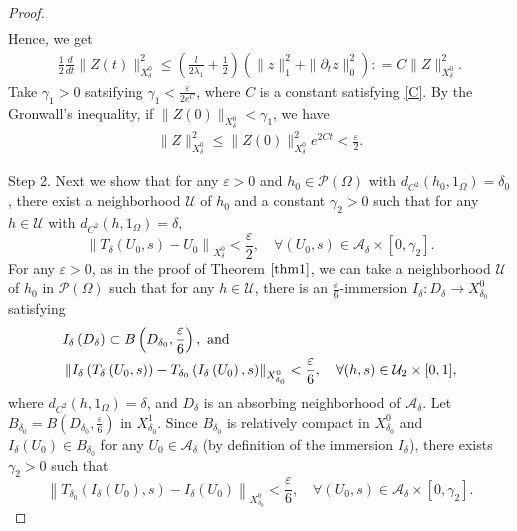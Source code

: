 \documentclass[11pt]{amsart}
\begin{document}
\begin{proof}
\begin{align*}
\end{align*}
Hence,  we get 
\begin{align}    \label{C}
    \frac{1}{2}\frac{d}{dt}\|Z(t)\|^2_{X^0_{\delta}}\leq \left(\frac{l}{2\lambda_1}+\frac{1}{2}\right)(\| z\|^2_1 +\|\partial_t z\|^2_0) 
   : = C\|Z\|^2_{X^0_{\delta}}.
\end{align}
Take $\gamma_1 >0$ satsifying $\gamma_1 < \frac{\varepsilon}{2e^C}$, where $C$ is a constant satisfying  \eqref{C}.
By the Gronwall's inequality, if $\|Z(0)\|_{X^0_{\delta}} < \gamma_1$, we have
\begin{align}\label{Lipschitz}
    \|Z\|^2_{X^0_{\delta}}\leq \|Z(0)\|^2_{X^0_{\delta}} e^{2Ct}<\frac{\varepsilon}{2}.
\end{align}

Step 2.
Next we show that for any $\varepsilon>0$ and $h_{0} \in \mathcal P(\Omega)$ with $d_{C^2}(h_0,1_{\Omega})=\delta_0$, there exist a neighborhood $\mathcal{U}$ of $h_{0}$ and a constant $\gamma_{2}>0$ such that for any $h \in \mathcal{U}$ with $d_{C^2}(h,1_{\Omega})=\delta$,
\begin{equation*}
\left\|T_{\delta}\left(U_{0}, s\right)-U_{0}\right\|_{X^0_{{\delta}}}<\frac{\varepsilon}{2}, \quad \forall\left(U_{0}, s\right) \in \mathcal{A}_{{\delta}} \times\left[0, \gamma_{2}\right] . 
\end{equation*}
For any $\varepsilon>0$, as in the proof of Theorem $\ref{thm1}$, we can take a neighborhood $\mathcal{U}$ of $h_{0}$ in $\mathcal P(\Omega)$ such that for any $h \in \mathcal{U}$, there is an $\frac{\varepsilon}{6}$-immersion $I_{{\delta}}: D_{{\delta}} \rightarrow {X^0_{{\delta}_{0}}}$ satisfying
\begin{align} \label{conti}
&I_\delta\left(D_{{\delta}}\right) \subset B\left(D_{{\delta}_{0}}, \frac{\varepsilon}{6}\right), \text { and } \notag \\
&\left\|I_{{\delta}}\left(T_{{\delta}}\left(U_{0}, s\right)\right)-T_{{\delta}_{0}}\left(I_{{\delta}}\left(U_{0}\right), s\right)\right\|_{X^0_{{\delta}_{0}}}<\frac{\varepsilon}{6}, \quad \forall(h, s) \in \mathcal{U}_2 \times[0,1],
\end{align}
where $d_{C^2}(h,1_{\Omega}) = \delta$, and $D_\delta$ is an absorbing neighborhood of $\mathcal A_\delta$.
Let $B_{{\delta}_0} = B(D_{{\delta}_0}, \frac{\varepsilon}{6})$ in $X^1_{{\delta}_0}$. Since $B_{{\delta}_{0}}$ is relatively compact in $X^0_{{\delta}_{0}}$ and $I_{{\delta}}\left(U_{0}\right) \in B_{{\delta}_{0}}$ for any $U_{0} \in \mathcal{A}_{{\delta}}$ (by definition of the immersion $I_{\delta}$), there exists $\gamma_{2}>0$ such that
\begin{equation*}
\left\|T_{{\delta}_{0}}\left(I_{{\delta}}\left(U_{0}\right), s\right)-I_{{\delta}}\left(U_{0}\right)\right\|_{X^0_{{\delta}_{0}}}<\frac{\varepsilon}{6}, \quad \forall\left(U_{0}, s\right) \in \mathcal{A}_{{\delta}} \times\left[0, \gamma_{2}\right] . 
\end{equation*}


\end{proof}
\end{document}
